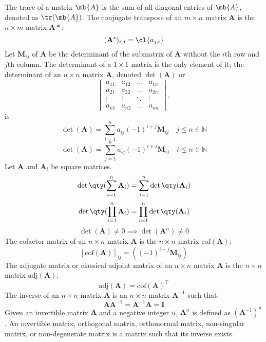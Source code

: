 \documentclass[a4paper,12pt]{report}
\begin{document}
The trace of a matrix $\mb{A}$ is the sum of all diagonal entries of $\mb{A}$, denoted as $\tr(\mb{A})$.
The conjugate transpose of an $m\times n$ matrix $\mathbf{A}$ is the $n\times m$ matrix $\mathbf{A}*$:
\[(\mathbf{A}^*)_{i,j}=\ol{a_{j,i}}\]
Let $\mathbf{M}_{ij}$ of $\mathbf{A}$ be the determinant of the submatrix of $\mathbf{A}$ without the $i$th row and $j$th column.
The determinant of a $1\times 1$ matrix is the only element of it; the determinant of an $n\times n$ matrix $\mathbf{A}$, denoted $\det(\mathbf{A})$ or 
\[\begin{vmatrix}a_{11} & a_{12} & \ldots & a_{1n}\\a_{21} & a_{22} & \ldots & a_{2n}\\\vdots & \vdots & \ddots & \vdots\\a_{n1} & a_{n2} & \ldots & a_{nn}\end{vmatrix},\]
is
\[\det(\mathbf{A})=\sum_{i=1}^na_{ij}(-1)^{i+j}\mathbf{M}_{ij}\quad j\leq n\in\mathbb{N}\]
\[\det(\mathbf{A})=\sum_{j=1}^na_{ij}(-1)^{i+j}\mathbf{M}_{ij}\quad i\leq n\in\mathbb{N}\]
Let $\mathbf{A}$ and $\mathbf{A}_i$ be square matrices.
\[\det\qty(\sum_{i=1}^n\mathbf{A}_i)=\sum_{i=1}^n\det\qty(\mathbf{A}_i)\]
\[\det\qty(\prod_{i=1}^n\mathbf{A}_i)=\prod_{i=1}^n\det\qty(\mathbf{A}_i)\]
\[\det(\mathbf{A})\neq 0\implies\det(\mathbf{A}^n)\neq 0\]
The cofactor matrix of an $n\times n$ matrix $\mathbf{A}$ is the $n\times n$ matrix $\mathrm{cof}(\mathbf{A})$:
\[[\mathrm{cof}(\mathbf{A})]_{ij}=\left((-1)^{i+j}\mathbf{M}_{ij}\right)\]
The adjugate matrix or classical adjoint matrix of an $n\times n$ matrix $\mathbf{A}$ is the $n\times n$ matrix $\mathrm{adj}(\mathbf{A})$:
\[\mathrm{adj}(\mathbf{A})=\mathrm{cof}(\mathbf{A})^\top\]
The inverse of an $n\times n$ matrix $\mathbf{A}$ is an $n\times n$ matrix $\mathbf{A}^{-1}$ such that:
\[\mathbf{A}\mathbf{A}^{-1}=\mathbf{A}^{-1}\mathbf{A}=\mathbf{I}\]
Given an invertible matrix $\mathbf{A}$ and a negative integer $n$, $\mathbf{A}^n$ is defined as $(\mathbf{A}^{-1})^n$.
An invertible matrix, orthogonal matrix, orthonormal matrix, non-singular matrix, or non-degenerate matrix is a matrix such that its inverse exists.
\end{document}
